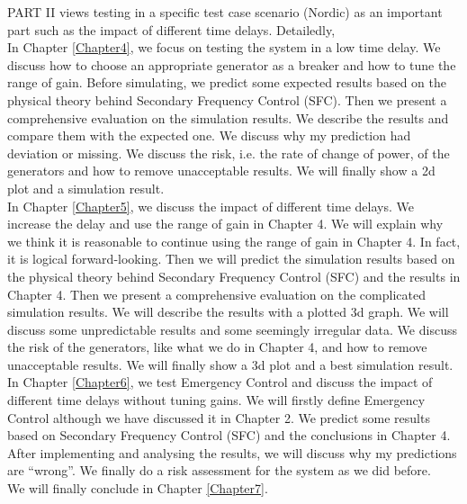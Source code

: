 \documentclass{report}
\begin{document}
PART II views testing in a specific test case scenario (Nordic) as an important part such as the impact of different time delays. Detailedly,\\

In Chapter \textcolor{red}{\ref{Chapter4}}, we focus on testing the system in a low time delay. We discuss how to choose an appropriate generator as a breaker and how to tune the range of  gain. Before simulating, we predict some expected results based on the physical theory behind Secondary Frequency Control (SFC). Then we present a comprehensive evaluation on the simulation results. We describe the results and compare them with the expected one. We discuss why my prediction had deviation or missing. We discuss the risk, i.e. the rate of change of power, of the generators and how to remove unacceptable results. We will finally show a 2d plot and a simulation result.\\

In Chapter \textcolor{red}{\ref{Chapter5}}, we discuss the impact of different time delays. We increase the delay and use the range of gain in Chapter 4. We will explain why we think it is reasonable to continue using the range of gain in Chapter 4. In fact, it is logical forward-looking. Then we will predict the simulation results based on the physical theory behind Secondary Frequency Control (SFC) and the results in Chapter 4. Then we present a comprehensive evaluation on the complicated simulation results. We will describe the results with a plotted 3d graph. We will discuss some unpredictable results and some seemingly irregular data. We discuss the risk of the generators, like what we do in Chapter 4, and how to remove unacceptable results. We will finally show a 3d plot and a best simulation result.\\

In Chapter \textcolor{red}{\ref{Chapter6}}, we test Emergency Control and discuss the impact of different time delays without tuning gains. We will firstly define Emergency Control although we have discussed it in Chapter 2. We predict some results based on Secondary Frequency Control (SFC) and the conclusions in Chapter 4. After implementing and analysing the results, we will discuss why my predictions are “wrong”. We finally do a risk assessment for the system as we did before.\\


We will finally conclude in Chapter \textcolor{red}{\ref{Chapter7}}.\\
\end{document}
